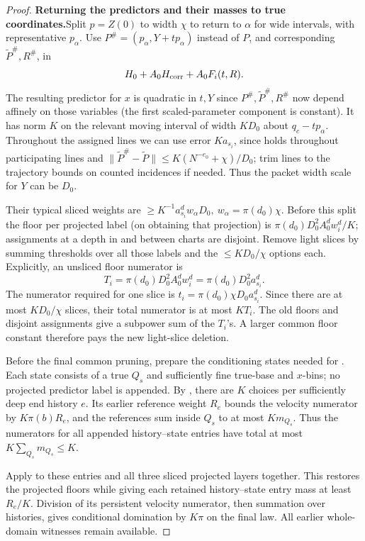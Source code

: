 \begin{proof}
\par\smallskip\noindent\textbf{Returning the predictors and their masses to true coordinates.}\quad  Split \(p=Z(0)\) to width \(\chi\) to return to \(\alpha\) for wide intervals, with representative \(p_{\alpha}\). Use \(P^\#=(p_\alpha,Y+t p_\alpha)\) instead of \(P\), and corresponding \(\widetilde P^\#,R^\#\), in
\[
 H_0 + A_0 H_{\rm corr}+A_0 F_i(t,R).
\]
The resulting predictor for \(x\) is quadratic in \(t,Y\) since \(P^\#,\widetilde P^\#,R^\#\) now depend affinely on those variables (the first scaled-parameter component is constant). It has norm \(K\) on the relevant moving interval of width \(K D_0\) about \(q_c-t p_\alpha\). Throughout the assigned lines we can use error \(K a_{s_i}\), since  holds throughout participating lines and \(\|\widetilde P^\#-\widetilde P\|\le K(N^{-e_0}+\chi)/D_0\); trim lines to the trajectory bounds on counted incidences if needed. Thus the packet width scale for \(Y\) can be \(D_0\).

Their typical sliced weights are \(\ge K^{-1}a_{s_i}^d w_\alpha D_0,\ w_\alpha=\pi(d_0)\chi\). Before this split the floor per projected label (on obtaining that projection) is \(\pi(d_0)D_0^2 A_0^d w_i^d/K\); assignments at a depth in and between charts are disjoint. Remove light slices by summing thresholds over all those labels and the \(\le K D_0/\chi\) options each. Explicitly, an unsliced floor numerator is
\[
 T_i=\pi(d_0)D_0^2 A_0^d w_i^d
     =\pi(d_0)D_0^2a_{s_i}^d.
\]
The numerator required for one slice is
\(t_i=\pi(d_0)\chi D_0a_{s_i}^d\).  Since there are at most
\(KD_0/\chi\) slices, their total numerator is at most \(KT_i\).
The old floors and disjoint assignments give a subpower sum of
the \(T_i\)'s.  A larger common floor constant therefore pays the
new light-slice deletion.

Before the final common pruning, prepare the conditioning states
needed for . Each state consists of a true
\(Q_s\) and sufficiently fine true-base and \(x\)-bins; no
projected predictor label is appended. By ,
there are \(K\) choices per sufficiently deep end history \(e\).
Its earlier reference weight \(R_e\) bounds the velocity numerator
by \(K\pi(b)R_e\), and the references sum inside \(Q_s\)
to at most \(Km_{Q_s}\). Thus the numerators for all appended
history--state entries have total at most
\(K\sum_{Q_s}m_{Q_s}\le K\).

Apply  to these entries and all
three sliced projected layers together. This restores the projected
floors while giving each retained history--state entry mass at least
\(R_e/K\). Division of its persistent velocity numerator, then
summation over histories, gives conditional domination by \(K\pi\)
on the final law. All earlier whole-domain witnesses remain available.


\end{proof}
